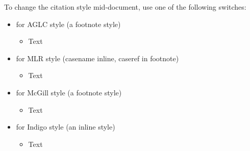 \p {}To change the citation style mid-document, use one of the following switches:
\citetrackerfalse
\begin{itemize}
\item {} for AGLC style (a footnote style)
\begin{itemize}
\item \lcsetstyleaglc Text
\end{itemize}
\item {} for MLR style (casename inline, caseref in footnote)
\begin{itemize}
\item \lcsetstylemlr  Text 
\end{itemize}
\item {} for McGill style (a footnote style)
\begin{itemize}
\item \lcsetstylemcgill  Text
\end{itemize}
\item {} for Indigo style (an inline style)
\begin{itemize}
\item \lcsetstyleindigo  Text 
\end{itemize}
\end{itemize}
\citetrackerfalse
\lcsetstylemcgill

